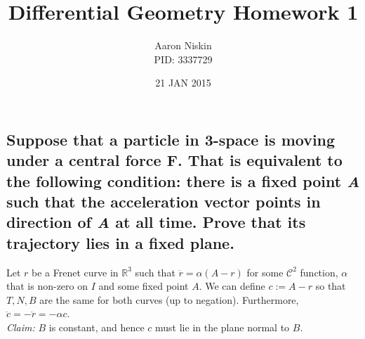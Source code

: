 \documentclass[12pt]{amsart}
\begin{document}
\title{Differential Geometry Homework 1}
\author{Aaron Niskin \\PID: 3337729}
\date{21 JAN 2015}
\maketitle

\section{}
\subsection{Suppose that a particle in 3-space is moving under a central force \textbf{F}. That is equivalent to the following condition: there is a fixed point \emph{A} such that the acceleration vector points in direction of \emph{A} at all time. Prove that its trajectory lies in a fixed plane.}
Let $r$ be a Frenet curve in $\mathbb{R}^3$ such that $\ddot r=\alpha\left(A-r\right)$ for some $\mathcal{C}^2$ function, $\alpha$ that is non-zero on $I$ and some fixed point $A$. We can define $c:=A-r$ so that $T,N,B$ are the same for both curves (up to negation). Furthermore, $\ddot c=-\ddot r=-\alpha c$.
\\\textit{Claim:} $B$ is constant, and hence $c$ must lie in the plane normal to $B$.
\end{document}
